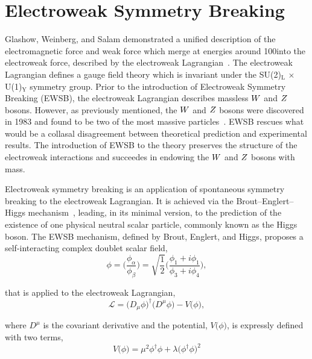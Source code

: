 \section{Electroweak Symmetry Breaking}
Glashow, Weinberg, and Salam demonstrated a unified description of the electromagnetic force 
and weak force which merge at energies around 100\GeV into the electroweak force,
described by the electroweak Lagrangian~\cite{Glashow:1961tr,SM1,SM3}.
The electroweak Lagrangian defines a gauge field theory which is 
invariant under the SU(2)$_{\text{L}} \, \times \, $U(1)$_{\text{Y}}$ symmetry group. 
Prior to the introduction of Electroweak Symmetry Breaking (EWSB),
the electroweak Lagrangian describes massless $W$ and $Z$ bosons.
However, as previously mentioned, the $W$ and $Z$ bosons were discovered in 1983
and found to be two of the most massive particles~\cite{AUBERT1983275,1983398}. 
EWSB rescues what would be a collasal disagreement between theoretical prediction
and experimental results. The introduction of EWSB to the theory preserves the structure of
the electroweak interactions and succeedes in endowing the $W$ and $Z$ bosons
with mass.

Electroweak symmetry breaking is an application of spontaneous symmetry breaking to
the electroweak Lagrangian. It is achieved via the Brout--Englert--Higgs
mechanism~\cite{Englert:1964et,Higgs:1964ia,Higgs:1964pj,Guralnik:1964eu,Higgs:1966ev,Kibble:1967sv},
leading, in its minimal version, to the prediction of the existence of one physical neutral scalar particle,
commonly known as the Higgs boson. The EWSB mechanism, defined by Brout, Englert, and Higgs,
proposes a self-interacting complex doublet scalar field,
\begin{equation}
\phi = \Bigg(\frac{\phi_{\alpha}}{\phi_{\beta}}\Bigg) = 
    \sqrt{\frac{1}{2}} \Bigg(\frac{\phi_{1} + i\phi_{1}}{\phi_{3} + i\phi_{4}}\Bigg),
\label{eqn:phi_doublet}
\end{equation}

that is applied to the electroweak Lagrangian, 
\begin{equation}
\mathcal{L} = \big(D_{\mu}\phi\big)^{\dagger} \big(D^{\mu}\phi\big) - V\big(\phi\big),
\end{equation}

where $D^{\mu}$ is the covariant derivative and the potential, $V\big(\phi\big)$, 
is expressly defined with two terms, 
\begin{equation}
V\big(\phi\big) = \mu^{2}\phi^{\dagger}\phi + \lambda\big(\phi^{\dagger}\phi\big)^{2}
\label{eqn:v_pot}
\end{equation}

